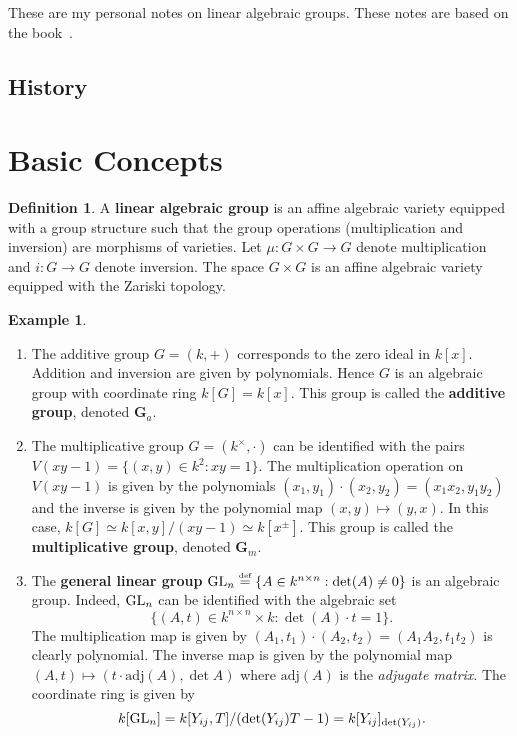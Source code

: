 \documentclass[]{pcmi}
\theoremstyle{plain}
\theoremstyle{definition}
\newtheorem{Definition}[equation]{Definition}
\newtheorem{Example}[equation]{Example}
\begin{document}
These are my personal notes on linear algebraic groups. These notes are based on the book~\cite{Malle_Testerman_2011}. 

\subsection{History}

\section{Basic Concepts}

\begin{Definition}
    A \textbf{linear algebraic group} is an affine algebraic variety equipped with a group structure such that the group operations (multiplication and inversion) are morphisms of varieties. Let $\mu : G \times G \to G$ denote multiplication and $i : G \to G$ denote inversion. The space $G \times G$ is an affine algebraic variety equipped with the Zariski topology. 
\end{Definition}


\begin{Example}
    \phantom{h}
    \begin{enumerate}
        \item The additive group $G = (k, +)$ corresponds to the zero ideal in $k[x]$. Addition and inversion are given by polynomials. Hence $G$ is an algebraic group with coordinate ring $k[G] = k[x]$. This group is called the \textbf{additive group}, denoted $\mathbf{G}_a$. 

        \item The multiplicative group $G = (k^\times, \cdot)$ can be identified with the pairs $V(xy-1) = \{(x, y) \in k^2 : xy = 1\}$. The multiplication operation on $V(xy-1)$ is given by the polynomials $(x_1, y_1) \cdot (x_2, y_2) = (x_1x_2, y_1y_2)$ and the inverse is given by the polynomial map $(x, y) \mapsto (y, x)$. In this case, $k[G] \simeq k[x,y]/(xy-1) \simeq k[x^\pm]$. This group is called the \textbf{multiplicative group}, denoted $\mathbf{G}_m$. 

        \item The \textbf{general linear group} $\operatorname{GL}_n \overset{\textup{\tiny def}}= \{ A \in k^{n \times n} : \det (A) \neq 0 \}$ is an algebraic group. Indeed, $\operatorname{GL}_n$ can be identified with the algebraic set 
        \[
            \{ (A, t) \in k^{n \times n} \times k : \det(A) \cdot t = 1 \}. 
        \]
        The multiplication map is given by $(A_1, t_1) \cdot (A_2, t_2) = (A_1A_2, t_1t_2)$ is clearly polynomial. The inverse map is given by the polynomial map $(A, t) \mapsto (t \cdot \text{adj}(A), \det A)$ where $\text{adj}(A)$ is the \emph{adjugate matrix}. The coordinate ring is given by 
        \[
            k[\operatorname{GL}_n] = k[Y_{ij}, T] / (\det (Y_{ij}) T - 1) = k[Y_{ij}]_{\det (Y_{ij})}. 
        \]
    \end{enumerate}
\end{Example}
\end{document}

